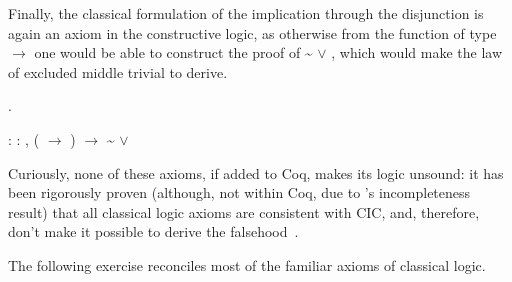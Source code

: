 \coqdocemptyline


Finally, the classical formulation of the implication through the
disjunction is again an axiom in the constructive logic, as otherwise
from the function of type  \ensuremath{\rightarrow}  one would be able to construct the
proof of \textasciitilde{} \ensuremath{\lor} , which would make the law of excluded middle
trivial to derive.
\begin{coqdoccode}
\coqdocemptyline
\coqdocnoindent
{} .\coqdoceol
\coqdocemptyline
\end{coqdoccode}


\coqdoceol
\coqdocemptyline
\coqdocnoindent
{}\coqdoceol
\coqdocindent{2.50em}
: \coqdockw{\ensuremath{\forall}}   : , ( \ensuremath{\rightarrow} ) \ensuremath{\rightarrow} \textasciitilde{} \ensuremath{\lor} 

\coqdocemptyline


Curiously, none of these axioms, if added to Coq, makes its logic
unsound: it has been rigorously proven (although, not within Coq, due
to \Godel's incompleteness result) that all classical logic axioms
are consistent with CIC, and, therefore, don't make it possible to
derive the falsehood~\cite{Werner:TACS97}.


The following exercise reconciles most of the familiar axioms of 
classical logic.


